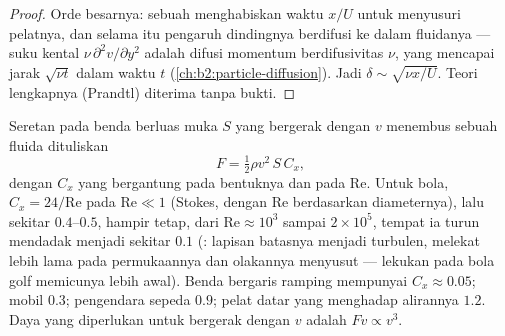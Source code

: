 \begin{proof}
Orde besarnya: sebuah  menghabiskan waktu $x/U$ untuk menyusuri
pelatnya, dan selama itu pengaruh dindingnya berdifusi ke dalam
fluidanya --- suku kental $\nu\,\partial^2v/\partial y^2$ adalah difusi
momentum berdifusivitas $\nu$, yang mencapai jarak $\sqrt{\nu t}$ dalam
waktu $t$ (\cref{ch:b2:particle-diffusion}). Jadi $\delta \sim \sqrt{\nu x
/U}$. Teori lengkapnya (Prandtl) diterima tanpa bukti.
\end{proof}

\begin{proposition}\label{prop:b2:viscous-flows:drag}
Seretan pada benda berluas muka $S$ yang bergerak dengan $v$ menembus sebuah fluida
dituliskan
\[
F = \tfrac12\rho v^2\,S\,C_x ,
\]
dengan \emph{} $C_x$ yang bergantung pada bentuknya dan pada
$\mathrm{Re}$. Untuk bola, $C_x = 24/\mathrm{Re}$ pada $\mathrm{Re} \ll 1$ (Stokes,
dengan $\mathrm{Re}$ berdasarkan diameternya), lalu sekitar $0.4$--$0.5$, hampir
tetap, dari $\mathrm{Re} \approx 10^3$ sampai $2 \times 10^5$, tempat ia turun
mendadak menjadi sekitar $0.1$ (\emph{}: lapisan batasnya menjadi
turbulen, melekat lebih lama pada permukaannya dan olakannya menyusut ---
lekukan pada bola golf memicunya lebih awal). Benda bergaris ramping mempunyai
$C_x \approx 0.05$; mobil $0.3$; pengendara sepeda $0.9$; pelat datar yang menghadap alirannya
$1.2$. Daya yang diperlukan untuk bergerak dengan $v$ adalah $Fv \propto v^3$.
\end{proposition}
\admitted

